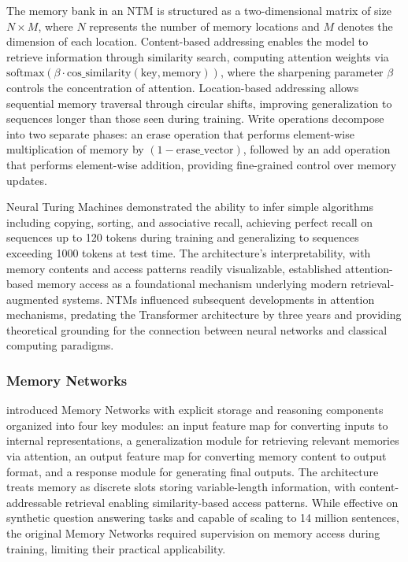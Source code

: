The memory bank in an NTM is structured as a two-dimensional matrix of size $N \times M$, where $N$ represents the number of memory locations and $M$ denotes the dimension of each location. Content-based addressing enables the model to retrieve information through similarity search, computing attention weights via $\text{softmax}(\beta \cdot \text{cos\_similarity}(\text{key}, \text{memory}))$, where the sharpening parameter $\beta$ controls the concentration of attention. Location-based addressing allows sequential memory traversal through circular shifts, improving generalization to sequences longer than those seen during training. Write operations decompose into two separate phases: an erase operation that performs element-wise multiplication of memory by $(1 - \text{erase\_vector})$, followed by an add operation that performs element-wise addition, providing fine-grained control over memory updates.

Neural Turing Machines demonstrated the ability to infer simple algorithms including copying, sorting, and associative recall, achieving perfect recall on sequences up to 120 tokens during training and generalizing to sequences exceeding 1000 tokens at test time. The architecture's interpretability, with memory contents and access patterns readily visualizable, established attention-based memory access as a foundational mechanism underlying modern retrieval-augmented systems. NTMs influenced subsequent developments in attention mechanisms, predating the Transformer architecture by three years and providing theoretical grounding for the connection between neural networks and classical computing paradigms.

\subsubsection{Memory Networks}

\citet{weston2015memory} introduced Memory Networks with explicit storage and reasoning components organized into four key modules: an input feature map for converting inputs to internal representations, a generalization module for retrieving relevant memories via attention, an output feature map for converting memory content to output format, and a response module for generating final outputs. The architecture treats memory as discrete slots storing variable-length information, with content-addressable retrieval enabling similarity-based access patterns. While effective on synthetic question answering tasks and capable of scaling to 14 million sentences, the original Memory Networks required supervision on memory access during training, limiting their practical applicability.

